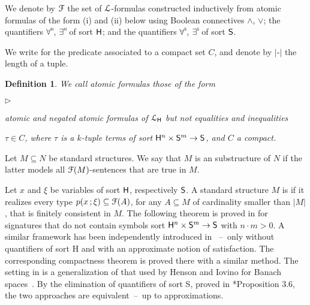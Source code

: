 \documentclass{amsproc}
\newcommand{\mylabel}[1]{{#1}\hfill}
\renewenvironment{itemize}
  {\begin{list}{$\triangleright$}{%
  \setlength{\parskip}{0mm}
  \setlength{\topsep}{.1\baselineskip}
  \setlength{\rightmargin}{0mm}
  \setlength{\listparindent}{0mm}
  \setlength{\itemindent}{0mm}
  \setlength{\labelwidth}{3ex}
  \setlength{\itemsep}{.1\baselineskip}
  \setlength{\parsep}{.1\baselineskip}
  \setlength{\partopsep}{0mm}
  \setlength{\labelsep}{1ex}
  \setlength{\leftmargin}{\labelwidth+\labelsep}
  \let\makelabel\mylabel}}{%
\end{list}}
\newcounter{thm}
\theoremstyle{mio}
\newtheorem{definition}[thm]{Definition}\tcolorboxenvironment{definition}{mythm}
\newtheorem{remark}[thm]{Remark}\tcolorboxenvironment{remark}{mythm}
\renewcommand*{\emph}[1]{%
   \smash{\tikz[baseline]\node[rectangle, fill=teal!25, rounded corners, inner xsep=0.5ex, inner ysep=0.2ex, anchor=base, minimum height = 2.7ex]{\strut #1};}}
\begin{document}
We denote by ${\EuScript F}$ the set of ${\EuScript L}$-formulas constructed inductively from atomic formulas of the form (i) and (ii) below using Boolean connectives $\wedge$, $\vee$; the quantifiers $\forall\raisebox{1.1ex}{\scaleto{\sf H}{.8ex}\kern-.2ex}$, $\exists\raisebox{1.1ex}{\scaleto{\sf H}{.8ex}\kern-.2ex}$ of sort ${\sf H}$; and the quantifiers $\forall\raisebox{1.1ex}{\scaleto{\sf S}{.8ex}\kern-.2ex}$, $\exists\raisebox{1.1ex}{\scaleto{\sf S}{.8ex}\kern-.2ex}$ of sort ${\sf S}$.

We write \emph{$x\in C$\/} for the predicate associated to a compact set $C$, and denote by $|\mbox{-}|$ the length of a tuple.

\begin{definition}
  We call atomic formulas those of the form
  \begin{itemize}
  \item[i.] atomic and negated atomic formulas of ${\EuScript L}_{\sf H}$ but not equalities and inequalities
  \item[ii.] $\tau\in C$, where $\tau$ is a $k$-tuple terms of sort ${\sf H}^n\times {\sf S}^m\to {\sf S}$, and $C$ a compact.
  \end{itemize}
\end{definition}


 Let $M\subseteq N$ be standard structures.
 We say that $M$ is an \emph{${\EuScript F}$-elementary\/} substructure of $N$ if the latter models all ${\EuScript F}(M)$-sentences that are true in $M$.

 Let $x$ and $\xi$ be variables of sort ${\sf H}$, respectively ${\sf S}$.
 A standard structure $M$ is \emph{${\EuScript F}$-saturated\/} if it realizes every type $p(x\,;\xi)\subseteq{\EuScript F}(A)$, for any $A\subseteq M$ of cardinality smaller than $|M|$, that is finitely consistent in $M$.
 The following theorem is proved in \cite{clcl} for signatures that do not contain symbols sort ${\sf H}^n\times{\sf S}^m\to {\sf S}$ with $n{\cdot}m>0$.
 A similar framework has been independently introduced in \cite{PC}~--~only without quantifiers of sort {\sf H} and with an approximate notion of satisfaction.
 The corresponding compactness theorem is proved there with a similar method.
 The setting in \cite{PC} is a generalization of that used by Henson and Iovino for Banach spaces~\cite{HI}.
 By the elimination of quantifiers of sort {\sf S}, proved in \cite{clcl}*{Proposition 3.6}, the two approaches are equivalent~--~up to approximations.
\end{document}
